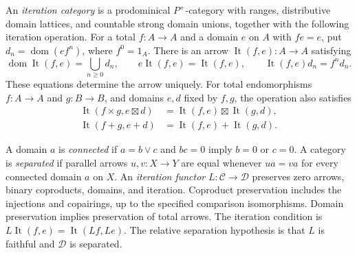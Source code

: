 \documentclass[11pt]{article}
\newcommand{\C}{\mathcal C}\newcommand{\D}{\mathcal D}\newcommand{\B}{\mathcal B}
\newcommand{\dom}{\operatorname{dom}}\newcommand{\ran}{\operatorname{ran}}
\newcommand{\It}{\operatorname{It}}\newcommand{\Tur}{\operatorname{Tur}}
\begin{document}
An \emph{iteration category} is a prodominical $P^+$-category with
ranges, distributive domain lattices, and countable strong domain
unions, together with the following iteration operation.
For a total $f:A\to A$ and a domain $e$ on $A$ with $fe=e$, put
$d_n=\dom(ef^n)$, where $f^0=1_A$. There is an arrow
$\It(f,e):A\to A$ satisfying
\[
 \dom\It(f,e)=\bigcup_{n\geq0}d_n,\qquad
 e\It(f,e)=\It(f,e),\qquad
 \It(f,e)d_n=f^nd_n.
\]
These equations determine the arrow uniquely. For total
endomorphisms $f:A\to A$ and $g:B\to B$, and domains $e,d$
fixed by $f,g$, the operation also satisfies
\begin{align*}
 \It(f\times g,e\boxtimes d)&=\It(f,e)\boxtimes\It(g,d),\\
 \It(f+g,e+d)&=\It(f,e)+\It(g,d).
\end{align*}

A domain $a$ is \emph{connected} if $a=b\vee c$ and $bc=0$
imply $b=0$ or $c=0$. A category is \emph{separated} if parallel
arrows $u,v:X\to Y$ are equal whenever $ua=va$ for every
connected domain $a$ on $X$. An \emph{iteration functor}
$L:\C\to\D$ preserves zero arrows, binary coproducts, domains,
and iteration. Coproduct preservation includes the injections and
copairings, up to the specified comparison isomorphisms. Domain preservation implies preservation of total arrows. The iteration condition is $L\It(f,e)=\It(Lf,Le)$. The relative separation hypothesis is that $L$ is faithful and $\D$ is separated.
\end{document}
